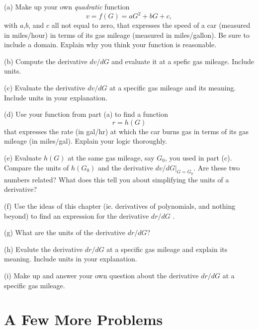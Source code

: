 \documentclass{ximera}
\begin{document}
\begin{question}  \label{Qdet5h5t5}
(a) Make up your own \emph{quadratic} function
\[
  v = f(G)  = aG^2 + bG +c,
\]
with $a$,$b$, and $c$ all  not equal to zero, that expresses the speed of a car (measured in miles/hour) in terms of its gas mileage (measured in miles/gallon). Be sure to include a domain. Explain why you think your function is reasonable.

(b) Compute the derivative $dv/dG$ and evaluate it at a spefic gas mileage. Include units.

(c) Evaluate the derivative $dv/dG$ at a specific gas mileage and its meaning. Include units in your explanation.

(d) Use your function from part (a) to find a function
\[
    r = h(G)
\]
that expresses the rate (in gal/hr) at which the car burns gas in terms of its gas mileage (in miles/gal).  Explain your logic thoroughly.

(e) Evaluate $h(G)$ at the same gas mileage, say $G_0$, you used in part (c). Compare the units of $h(G_0)$ and the derivative $dv/dG\Big|_{G=G_0}$. Are these two numbers related? What does this tell you about simplifying the units of a derivative?

(f) Use the ideas of this chapter (ie. derivatives of polynomials, and nothing beyond) to find an expression for the derivative
$dr/dG$ .

(g) What are the units of the derivative $dr/dG$? 

(h) Evalute the derivative $dr/dG$ at a specific gas mileage and explain its meaning. Include units in your explanation.

(i) Make up and answer your own question about the derivative $dr/dG$ at a specific gas mileage.

\end{question}


\section*{A Few More Problems}
\end{document}
